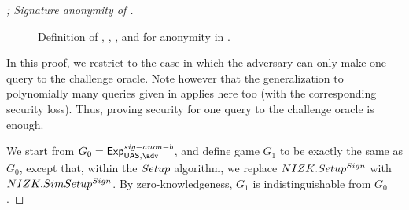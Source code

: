 \begin{proof}[; Signature anonymity of \CUASGen]
\begin{figure}[ht!]
\begin{minipage}[t]{\textwidth}
      \begin{minipage}[t]{\textwidth}
        \begin{minipage}[t]{0.55\textwidth}
        \end{minipage}
        \begin{minipage}[t]{0.45\textwidth}
        \end{minipage}
      \end{minipage}    
    \end{minipage}
    \label{fig:sim-anon}
    \caption{Definition of \SimSetup, \SIMOBTAIN, \SIMSIGN, and \SIMOPEN for
      anonymity in \CUASGen.}
  \end{figure}
  \fi

  In this proof, we restrict to the case in which the adversary can only make
  one query to the challenge oracle. Note however that the generalization to
  polynomially many queries given in \cite{bsz05} applies here too (with the
  corresponding security loss). Thus, proving security for one query to the
  challenge oracle is enough.

  We start from $G_0=\ExpSigAnonb$, and define game $G_1$ to be exactly the same
  as $G_0$, except that, within the $Setup$ algorithm, we replace
  $NIZK.Setup^{Sign}$ with $NIZK.SimSetup^{Sign}$. By zero-knowledgeness,
  $G_1$ is indistinguishable from $G_0$.
  

\end{proof}
